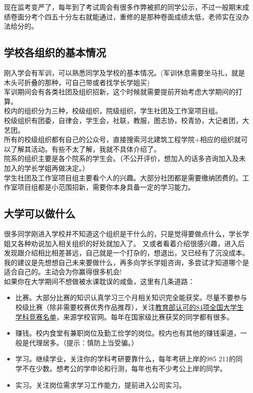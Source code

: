\documentclass[12pt]{article} %
\begin{document}
	现在监考变严了，每年到了考试周会有很多作弊被抓的同学公示，不过一般期末成绩卷面分考个四五十分左右就能通过，重修的是那种卷面成绩太低，老师实在没办法给分的。
	
	\subsection{学校各组织的基本情况}
	刚入学会有军训，可以熟悉同学及学校的基本情况。(军训休息需要坐马扎，就是木头可折叠的那种，可自己带或者找学长学姐买)\\
	
	军训期间会有各类社团及组织招新，这个时候就需要提前开始考虑大学期间的打算。\\
	
	校内的组织分为三种，校级组织，院级组织，学生社团及工作室项目组。\\
	
	
	校级组织有团委，自律会，学生会，社联，教服，图志协，校青协，大记者团，大艺团。\\
	
	所有的校级组织都有自己的公众号，直接搜索河北建筑工程学院+相应的组织就可以了解其活动。有些不太了解，我就不具体介绍了。\\
	
	院系的组织主要是各个院系的学生会。（不公开评价，想加入的话多咨询加入及未加入的学长学姐再做决定。）\\
	
	学生社团及工作室项目组主要看个人的兴趣。大部分社团都是需要缴纳团费的。工作室项目组都是小范围招新，需要你本身具备一定的学习能力。\\
	
	\subsection{大学可以做什么}
	很多同学刚进入学校并不知道这个组织是干什么的，只是觉得要做点什么，学长学姐又各种劝说加入相关组织的好处就加入了。
	又或者看着介绍很感兴趣，进入后发现跟介绍相比相差甚远，自己就是一个打杂的，想退出，又已经有了沉没成本。\\
	
	我的建议是先想想自己未来要做什么，再多向学长学姐咨询，多尝试才知道哪个是适合自己的。主动会为你赢得很多机会!\\
	
	如果你在大学期间不想做被水课耽误的咸鱼，这里有几条道路：
	
	\begin{itemize}
		\item 比赛。大部分比赛的知识认真学习三个月相关知识完全能获奖。尽量不要参与校级比赛（除非需要校赛优秀作品推荐），关注\href{https://tieba.baidu.com/p/9062077312?pn=1}{教育部认可的84项全国大学生学科竞赛名单}，来源学校官网。每年在国家级比赛获奖的同学都有很多。
		\item 赚钱。校内食堂有兼职岗位及勤工俭学的岗位。校内也有其他的赚钱渠道，一般是代理居多。（提示：慎防上当受骗。）
		\item 学习。继续学业，关注你的学科考研要靠什么，每年考研上岸的985 211的同学不在少数。想考公的学申论和行测，每年也有不少考公上岸的同学。
		\item 实习。关注岗位需求学习工作能力，提前进入公司实习。
	\end{itemize}
	
\end{document}
